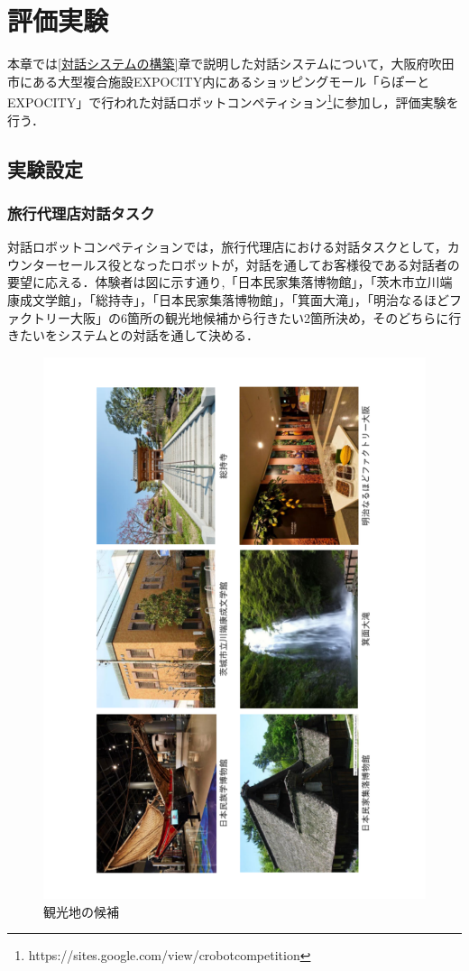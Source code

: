 \section{評価実験}
\label{評価実験}

本章では\ref{対話システムの構築}章で説明した対話システムについて，大阪府吹田市にある大型複合施設EXPOCITY内にあるショッピングモール「らぽーとEXPOCITY」で行われた対話ロボットコンペティション\footnote{https://sites.google.com/view/crobotcompetition}に参加し，評価実験を行う．

\subsection{実験設定}

\subsubsection{旅行代理店対話タスク}
対話ロボットコンペティションでは，旅行代理店における対話タスクとして，カウンターセールス役となったロボットが，対話を通してお客様役である対話者の要望に応える．体験者は図\label{6place}に示す通り,「日本民家集落博物館」，「茨木市立川端康成文学館」，「総持寺」，「日本民家集落博物館」，「箕面大滝」，「明治なるほどファクトリー大阪」の6箇所の観光地候補から行きたい2箇所決め，そのどちらに行きたいをシステムとの対話を通して決める．
\begin{figure}[th]
    \centering
    \includegraphics[scale=0.5,angle=270]{pic/6place.pdf}
    \caption{観光地の候補}
    \label{6place}
\end{figure}


